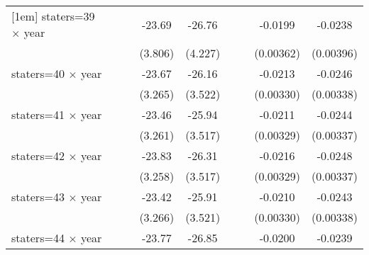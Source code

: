 {\begin{longtable}{l*{8}{c}}
[1em]
staters=39 $\times$ year&                     &                     &      -23.69\sym{***}&      -26.76\sym{***}&                     &                     &     -0.0199\sym{***}&     -0.0238\sym{***}\\
                    &                     &                     &     (3.806)         &     (4.227)         &                     &                     &   (0.00362)         &   (0.00396)         \\
[1em]
staters=40 $\times$ year&                     &                     &      -23.67\sym{***}&      -26.16\sym{***}&                     &                     &     -0.0213\sym{***}&     -0.0246\sym{***}\\
                    &                     &                     &     (3.265)         &     (3.522)         &                     &                     &   (0.00330)         &   (0.00338)         \\
[1em]
staters=41 $\times$ year&                     &                     &      -23.46\sym{***}&      -25.94\sym{***}&                     &                     &     -0.0211\sym{***}&     -0.0244\sym{***}\\
                    &                     &                     &     (3.261)         &     (3.517)         &                     &                     &   (0.00329)         &   (0.00337)         \\
[1em]
staters=42 $\times$ year&                     &                     &      -23.83\sym{***}&      -26.31\sym{***}&                     &                     &     -0.0216\sym{***}&     -0.0248\sym{***}\\
                    &                     &                     &     (3.258)         &     (3.517)         &                     &                     &   (0.00329)         &   (0.00337)         \\
[1em]
staters=43 $\times$ year&                     &                     &      -23.42\sym{***}&      -25.91\sym{***}&                     &                     &     -0.0210\sym{***}&     -0.0243\sym{***}\\
                    &                     &                     &     (3.266)         &     (3.521)         &                     &                     &   (0.00330)         &   (0.00338)         \\
[1em]
staters=44 $\times$ year&                     &                     &      -23.77\sym{***}&      -26.85\sym{***}&                     &                     &     -0.0200\sym{***}&     -0.0239\sym{***}\\

\end{longtable}}
